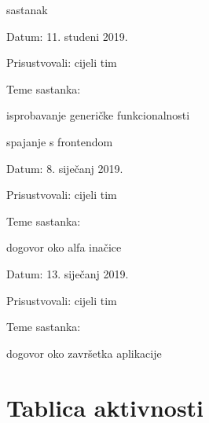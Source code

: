 \begin{packed_enum}
			\item  sastanak
			
			\item[] \begin{packed_item}
				\item Datum: 11. studeni 2019.
				\item Prisustvovali: cijeli tim
				\item Teme sastanka:
				\begin{packed_item}
					\item isprobavanje generičke funkcionalnosti 
					\item spajanje s frontendom
				\end{packed_item}
			\end{packed_item}
		
		\item[] \begin{packed_item}
			\item Datum: 8. siječanj 2019.
			\item Prisustvovali: cijeli tim
			\item Teme sastanka:
			\begin{packed_item}
				\item dogovor oko alfa inačice 
			\end{packed_item}
		\end{packed_item}
	
	\item[] \begin{packed_item}
		\item Datum: 13. siječanj 2019.
		\item Prisustvovali: cijeli tim
		\item Teme sastanka:
		\begin{packed_item}
			\item dogovor oko završetka aplikacije
		\end{packed_item}
	\end{packed_item}
			
			
		\end{packed_enum}
		
		\eject
		\section*{Tablica aktivnosti}
		
			
			
			 
						
